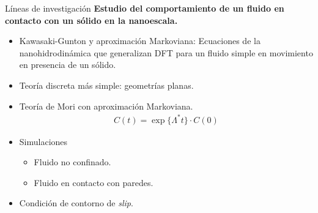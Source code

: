 \documentclass{beamer}
\begin{document}
%

\begin{frame}{Líneas de investigación}
  \textbf{Estudio del comportamiento de un fluido en contacto con un sólido en la nanoescala.}
  \begin{itemize}
    \item<1-> \alert{Kawasaki-Gunton} y aproximación Markoviana: Ecuaciones de la nanohidrodinámica que generalizan DFT para un fluido simple en movimiento en presencia de un sólido.
    \item<2-> Teoría discreta más simple: \alert{geometrías planas}.
    \item<3-> \alert{Teoría de Mori} con aproximación Markoviana. 
      \begin{align}
        C(t)=\exp\{\Lambda^*t\}\cdot C(0)
        \nonumber
      \end{align}
    \item<4-> \alert{Simulaciones}
      \begin{itemize}
        \item Fluido no confinado. 
        \item Fluido en contacto con paredes. 
      \end{itemize}
    \item<5-> \alert{Condición de contorno} de \textit{slip}. 
  \end{itemize}
\end{frame}
\end{document}
